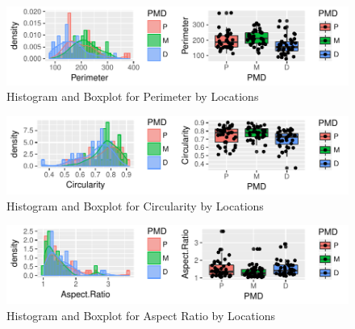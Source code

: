 \documentclass{article}\usepackage[]{graphicx}\usepackage[]{color}
\makeatletter
\def\maxwidth{ %
  \ifdim\Gin@nat@width>\linewidth
    \linewidth
  \else
    \Gin@nat@width
  \fi
}
\newenvironment{knitrout}{}{} %
\numberwithin{figure}{subsection} %
\numberwithin{table}{subsection} %
\makeatother
\begin{document}
\begin{figure}[!htbp]
  \centering
\begin{knitrout}
\color{fgcolor}
\includegraphics[width=\maxwidth]{figure/unnamed-chunk-6-1} 

\end{knitrout}
  \caption{Histogram and Boxplot for Perimeter by Locations}
  \label{fig_peri_pmd}
\end{figure}
\vspace{0.5cm}

\begin{figure}[!htbp]
  \centering
\begin{knitrout}
\color{fgcolor}
\includegraphics[width=\maxwidth]{figure/unnamed-chunk-7-1} 

\end{knitrout}
  \caption{Histogram and Boxplot for Circularity by Locations}
  \label{fig_cir_pmd}
\end{figure}
\vspace{0.5cm}

\begin{figure}[!htbp]
  \centering
\begin{knitrout}
\color{fgcolor}
\includegraphics[width=\maxwidth]{figure/unnamed-chunk-8-1} 

\end{knitrout}
  \caption{Histogram and Boxplot for Aspect Ratio by Locations}
  \label{fig_ar_pmd}
\end{figure}
\end{document}
